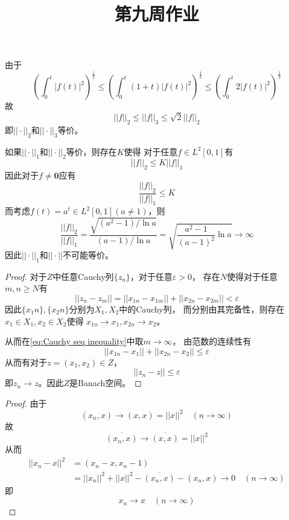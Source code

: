 \documentclass[cn]{homework}
\title{第九周作业}
\begin{document}
    \maketitle

    \problem
    由于
    \[\left(\int_0^t|f(t)|^2\right)^{\frac{1}{2}}
    \leq
    \left(\int_0^t(1+t)|f(t)|^2\right)^{\frac{1}{2}}
    \leq
    \left(\int_0^t2|f(t)|^2\right)^{\frac{1}{2}}\]
    故
    \[||f||_2\leq||f||_3\leq\sqrt{2}||f||_2\]
    即$||\cdot||_2$和$||\cdot||_3$等价。

    如果$||\cdot||_1$和$||\cdot||_2$等价，则存在$K$使得
    对于任意$f\in L^2[0,1]$有
    \[||f||_2\leq K||f||_1\]
    因此对于$f\neq \boldsymbol 0$应有
    \[\frac{||f||_2}{||f||_1}\leq K\]
    而考虑$f(t)=a^t\in L^2[0,1](a\neq 1)$，则
    \[\frac{||f||_2}{||f||_1}
    =\frac{\sqrt{(a^2-1)/\ln a}}{(a-1)/\ln a}
    =\sqrt{\frac{a^2-1}{(a-1)^2}\ln a}\to\infty\]
    因此$||\cdot||_1$和$||\cdot||$不可能等价。

    \problem
    \begin{proof}
        对于$Z$中任意Cauchy列$\{z_n\}$，对于任意$\varepsilon>0$，
        存在$N$使得对于任意$m,n\geq N$有
        \begin{equation}
            \label{eq:Cauchy seq inequality}
            ||z_n-z_m||=||x_{1n}-x_{1m}||+||x_{2n}-x_{2m}||
            <\varepsilon
        \end{equation}
        因此$\{x_1n\},\{x_2n\}$分别为$X_1,X_2$中的Cauchy列，
        而分别由其完备性，则存在$x_1\in X_1,x_2\in X_2$使得
        $x_{1n}\to x_1,x_{2n}\to x_2$。

        从而在\cref{eq:Cauchy seq inequality}中取$m\to\infty$，
        由范数的连续性有
        \[||x_{1n}-x_1||+||x_{2n}-x_2||\leq\varepsilon\]
        从而有对于$z=(x_1,x_2)\in Z$，
        \[||z_n-z||\leq\varepsilon\]
        即$z_n\to z$。因此$Z$是Banach空间。
    \end{proof}

    \problem

    \problem
    \begin{proof}
        由于
        \[(x_n,x)\to(x,x)=||x||^2\quad(n\to\infty)\]
        故
        \[\overline{(x_n,x)}\to\overline{(x,x)}=||x||^2\]
        从而
        \[\begin{aligned}
            ||x_n-x||^2&=(x_n-x,x_n-1)\\
            &=||x_n||^2+||x||^2-\overline{(x_n,x)}-(x_n,x)
            \to 0
            \quad(n\to\infty)
        \end{aligned}\]
        即
        \[x_n\to x\quad(n\to\infty)\]
    \end{proof}
\end{document}
